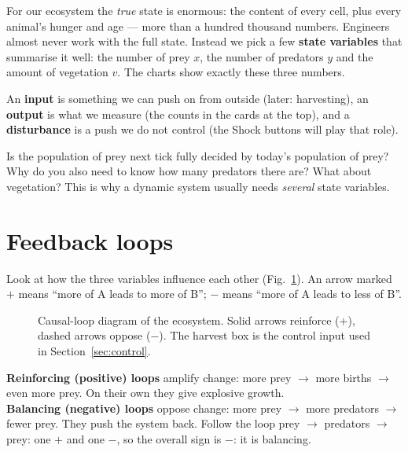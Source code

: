 \documentclass[11pt,a4paper]{article}
\begin{document}
For our ecosystem the \emph{true} state is enormous: the content of every cell, plus every animal's hunger and
age --- more than a hundred thousand numbers. Engineers almost never work with the full state. Instead we pick a
few \textbf{state variables} that summarise it well: the number of prey $x$, the number of predators $y$ and
the amount of vegetation $v$. The charts show exactly these three numbers.

An \textbf{input} is something we can push on from outside (later: harvesting), an \textbf{output} is what we
measure (the counts in the cards at the top), and a \textbf{disturbance} is a push we do not control
(the Shock buttons will play that role).

\begin{think}
Is the population of prey next tick fully decided by today's population of prey? Why do you also need to know
how many predators there are? What about vegetation? This is why a dynamic system usually needs
\emph{several} state variables.
\end{think}

\section{Feedback loops}
Look at how the three variables influence each other (Fig.~\ref{fig:loops}). An arrow marked $+$ means
``more of A leads to more of B''; $-$ means ``more of A leads to less of B''.

\begin{figure}[!htb]
\centering

\caption{Causal-loop diagram of the ecosystem. Solid arrows reinforce ($+$), dashed arrows oppose ($-$).
The harvest box is the control input used in Section~\ref{sec:control}.}
\label{fig:loops}
\end{figure}

\begin{idea}
\textbf{Reinforcing (positive) loops} amplify change: more prey $\rightarrow$ more births $\rightarrow$ even more prey.
On their own they give explosive growth.\\
\textbf{Balancing (negative) loops} oppose change: more prey $\rightarrow$ more predators $\rightarrow$ fewer prey.
They push the system back. Follow the loop prey $\rightarrow$ predators $\rightarrow$ prey: one $+$ and one $-$, so the
overall sign is $-$: it is balancing.
\end{idea}
\end{document}
